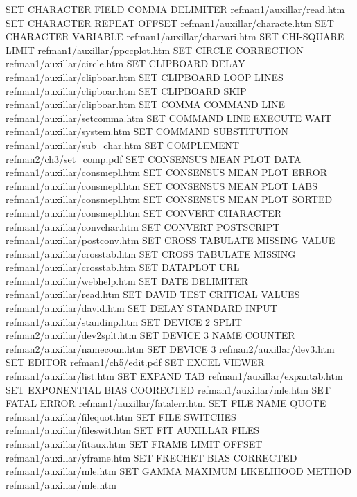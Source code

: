 SET CHARACTER FIELD COMMA DELIMITER     refman1/auxillar/read.htm
SET CHARACTER REPEAT OFFSET             refman1/auxillar/characte.htm
SET CHARACTER VARIABLE                  refman1/auxillar/charvari.htm
SET CHI-SQUARE LIMIT                    refman1/auxillar/ppccplot.htm
SET CIRCLE CORRECTION                   refman1/auxillar/circle.htm
SET CLIPBOARD DELAY                     refman1/auxillar/clipboar.htm
SET CLIPBOARD LOOP LINES                refman1/auxillar/clipboar.htm
SET CLIPBOARD SKIP                      refman1/auxillar/clipboar.htm
SET COMMA COMMAND LINE                  refman1/auxillar/setcomma.htm
SET COMMAND LINE EXECUTE WAIT           refman1/auxillar/system.htm
SET COMMAND SUBSTITUTION                refman1/auxillar/sub_char.htm
SET COMPLEMENT                          refman2/ch3/set_comp.pdf
SET CONSENSUS MEAN PLOT DATA            refman1/auxillar/consmepl.htm
SET CONSENSUS MEAN PLOT ERROR           refman1/auxillar/consmepl.htm
SET CONSENSUS MEAN PLOT LABS            refman1/auxillar/consmepl.htm
SET CONSENSUS MEAN PLOT SORTED          refman1/auxillar/consmepl.htm
SET CONVERT CHARACTER                   refman1/auxillar/convchar.htm
SET CONVERT POSTSCRIPT                  refman1/auxillar/postconv.htm
SET CROSS TABULATE MISSING VALUE        refman1/auxillar/crosstab.htm
SET CROSS TABULATE MISSING              refman1/auxillar/crosstab.htm
SET DATAPLOT URL                        refman1/auxillar/webhelp.htm
SET DATE DELIMITER                      refman1/auxillar/read.htm
SET DAVID TEST CRITICAL VALUES          refman1/auxillar/david.htm
SET DELAY STANDARD INPUT                refman1/auxillar/standinp.htm
SET DEVICE 2 SPLIT                      refman2/auxillar/dev2splt.htm
SET DEVICE 3 NAME COUNTER               refman2/auxillar/namecoun.htm
SET DEVICE 3                            refman2/auxillar/dev3.htm
SET EDITOR                              refman1/ch5/edit.pdf
SET EXCEL VIEWER                        refman1/auxillar/list.htm
SET EXPAND TAB                          refman1/auxillar/expantab.htm
SET EXPONENTIAL BIAS COORECTED          refman1/auxillar/mle.htm
SET FATAL ERROR                         refman1/auxillar/fatalerr.htm
SET FILE NAME QUOTE                     refman1/auxillar/filequot.htm
SET FILE SWITCHES                       refman1/auxillar/fileswit.htm
SET FIT AUXILLAR FILES                  refman1/auxillar/fitaux.htm
SET FRAME LIMIT OFFSET                  refman1/auxillar/yframe.htm
SET FRECHET BIAS CORRECTED              refman1/auxillar/mle.htm
SET GAMMA MAXIMUM LIKELIHOOD METHOD     refman1/auxillar/mle.htm
